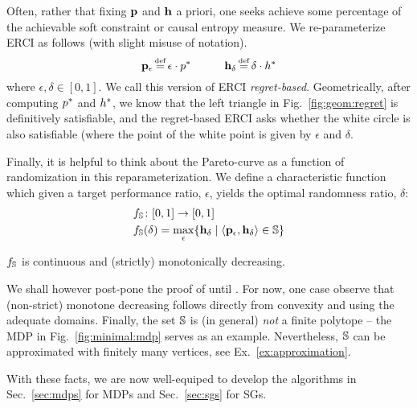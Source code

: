 
Often, rather that fixing $\mathbf{p}$ and $\mathbf{h}$ a
  priori, one seeks achieve some percentage of the achievable soft
  constraint or causal entropy measure.  We
  re-parameterize ERCI as follows (with slight misuse of notation).
  \begin{equation}
    \scthreshold_\epsilon \eqdef \epsilon \cdot \scopt
    \hspace{3em}
    \randomness_\delta \eqdef  \delta \cdot \rndopt
  \end{equation}
  where $\epsilon, \delta \in [0, 1]$. We call this version of ERCI \emph{regret-based}. Geometrically, after computing $p^{*}$ and $h^{*}$, we know that the left triangle in Fig.~\ref{fig:geom:regret} is definitively satisfiable, and the regret-based ERCI asks whether the white circle is also satisfiable (where the point of the white point is given by $\epsilon$ and $\delta$. %

Finally, it is helpful to think about the Pareto-curve as a function of randomization in this reparameterization.  We define a characteristic function which given a target
performance ratio, $\epsilon$, yields the optimal randomness ratio,
$\delta$:
\begin{equation}
  \begin{split}
    & f_\mathbb{S}\colon [0,1] \rightarrow [0, 1]    \\
    & f_\mathbb{S}(\delta) = \max_\epsilon \{ \mathbf{h}_\delta \mid \langle
    \mathbf{p}_\epsilon, \mathbf{h}_\delta \rangle \in \mathbb{S} \} 
  \end{split}
\end{equation}
\begin{proposition}\label{prop:monotone}
  $f_\mathbb{S}$ is continuous and (strictly) monotonically decreasing.
\end{proposition}
 We shall however post-pone the proof of
 until {\color{red}{where?}}. For now, one case observe that
(non-strict) monotone decreasing follows directly from convexity and
using the adequate domains.
Finally, the set  $\mathbb{S}$ is (in general) \emph{not} a finite polytope -- the MDP in Fig.~\ref{fig:minimal:mdp} serves as an example. Nevertheless,  $\mathbb{S}$ can be approximated with finitely many vertices, see Ex.~\ref{ex:approximation}.

With these facts, we are now well-equiped to develop the algorithms in Sec.~\ref{sec:mdps} for MDPs and Sec.~\ref{sec:sgs} for SGs.

